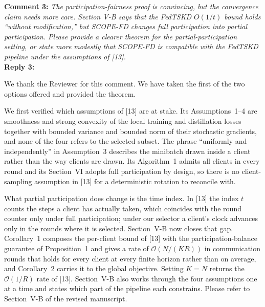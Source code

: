 \documentclass[10pt]{article}
\begin{document}
\noindent
\textbf{Comment 3:} \textit{The participation-fairness proof is convincing, but the convergence claim needs more care. Section V-B says that the FedTSKD $O(1/t)$ bound holds ``without modification,'' but SCOPE-FD changes full participation into partial participation. Please provide a clearer theorem for the partial-participation setting, or state more modestly that SCOPE-FD is compatible with the FedTSKD pipeline under the assumptions of [13].} \\
\noindent
\textbf{Reply 3:} {We thank the Reviewer for this comment. We have taken the first of the two options offered and provided the theorem.

We first verified which assumptions of [13] are at stake. Its Assumptions~1--4 are smoothness and strong convexity of the local training and distillation losses together with bounded variance and bounded norm of their stochastic gradients, and none of the four refers to the selected subset. The phrase ``uniformly and independently'' in Assumption~3 describes the minibatch drawn inside a client rather than the way clients are drawn. Its Algorithm~1 admits all clients in every round and its Section~VI adopts full participation by design, so there is no client-sampling assumption in [13] for a deterministic rotation to reconcile with.

What partial participation does change is the time index. In [13] the index $t$ counts the steps a client has actually taken, which coincides with the round counter only under full participation; under our selector a client's clock advances only in the rounds where it is selected. Section~V-B now closes that gap. Corollary~1 composes the per-client bound of [13] with the participation-balance guarantee of Proposition~1 and gives a rate of $\mathcal{O}(N/(KR))$ in communication rounds that holds for every client at every finite horizon rather than on average, and Corollary~2 carries it to the global objective. Setting $K=N$ returns the $\mathcal{O}(1/R)$ rate of [13]. Section~V-B also works through the four assumptions one at a time and states which part of the pipeline each constrains. Please refer to Section~V-B of the revised manuscript.}\\
\end{document}
